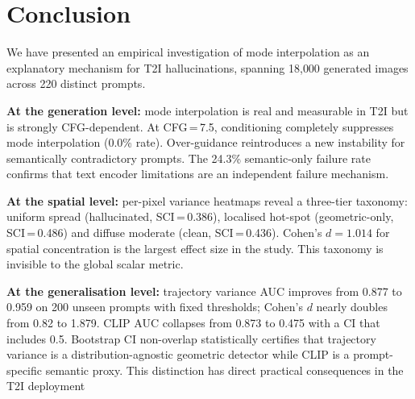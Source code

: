 \documentclass[conference]{IEEEtran}
\begin{document}
\section{Conclusion}
\label{sec:conclusion}

We have presented an empirical investigation of mode interpolation
as an explanatory mechanism for T2I hallucinations, spanning 18{,}000
generated images across 220 distinct prompts.

\textbf{At the generation level:} mode interpolation is real and
measurable in T2I but is strongly CFG-dependent. At CFG\,=\,7.5,
conditioning completely suppresses mode interpolation (0.0\% rate).
Over-guidance reintroduces a new instability for semantically
contradictory prompts. The 24.3\% semantic-only failure rate confirms
that text encoder limitations are an independent failure mechanism.

\textbf{At the spatial level:} per-pixel variance heatmaps reveal
a three-tier taxonomy: uniform spread (hallucinated, SCI\,=\,0.386),
localised hot-spot (geometric-only, SCI\,=\,0.486) and diffuse
moderate (clean, SCI\,=\,0.436). Cohen's $d{=}1.014$ for spatial
concentration is the largest effect size in the study. This taxonomy
is invisible to the global scalar metric.

\textbf{At the generalisation level:} trajectory variance AUC
improves from 0.877 to 0.959 on 200 unseen prompts with fixed
thresholds; Cohen's $d$ nearly doubles from 0.82 to 1.879. CLIP
AUC collapses from 0.873 to 0.475 with a CI that includes 0.5.
Bootstrap CI non-overlap statistically certifies that trajectory
variance is a distribution-agnostic geometric detector while CLIP
is a prompt-specific semantic proxy. This
distinction has direct practical consequences in the T2I deployment


\end{document}
